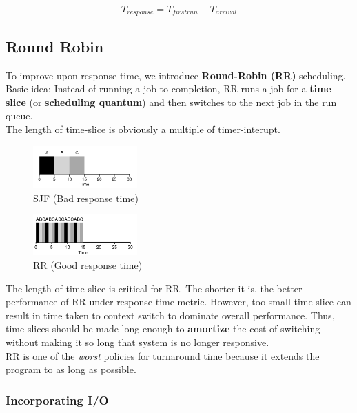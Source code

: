 $$
T_{response} = T_{firstrun} - T_{arrival}
$$

\subsection{Round Robin}

To improve upon response time, we introduce \textbf{Round-Robin (RR)}
scheduling. Basic idea: Instead of running a job to completion, RR runs a job
for a \textbf{time slice} (or \textbf{scheduling quantum}) and then switches
to the next job in the run queue.\\

The length of time-slice is obviously a multiple of timer-interupt.\\

\begin{figure}[h!]
    \begin{center}
        \includegraphics[width=4cm]{img/76}
        \caption{SJF (Bad response time)}
    \end{center}
\end{figure}

\begin{figure}[h!]
    \begin{center}
        \includegraphics[width=4cm]{img/77}
        \caption{RR (Good response time)}
    \end{center}
\end{figure}

The length of time slice is critical for RR. The shorter it is, the better
performance of RR under response-time metric. However, too small time-slice can
result in time taken to context switch to dominate overall performance. Thus,
time slices should be made long enough to  \textbf{amortize} the cost of
switching without making it so long that system is no longer responsive.\\

RR is one of the \textit{worst} policies for turnaround time because it extends
the program to as long as possible.

\subsubsection{Incorporating I/O}

